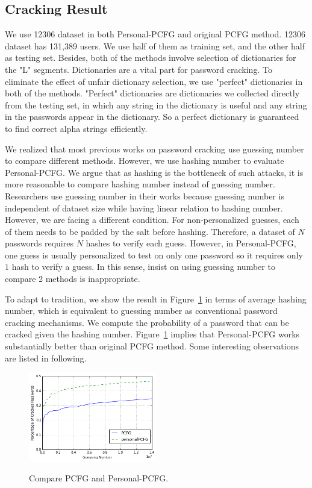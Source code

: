 \subsection{Cracking Result}
We use 12306 dataset in both Personal-PCFG and original PCFG method. 12306 dataset has 131,389 users. We use half of them as training set, and the other half as testing set. Besides, both of the methods involve selection of dictionaries for the "L" segments. Dictionaries are a vital part for password cracking. To eliminate the effect of unfair dictionary selection, we use "perfect" dictionaries in both of the methods. "Perfect" dictionaries are dictionaries we collected directly from the testing set, in which any string in the dictionary is useful and any string in the passwords appear in the dictionary. So a perfect dictionary is guaranteed to find correct alpha strings efficiently.

We realized that most previous works on password cracking use guessing number to compare different methods. However, we use hashing number to evaluate Personal-PCFG. We argue that as hashing is the bottleneck of such attacks, it is more reasonable to compare hashing number instead of guessing number. Researchers use guessing number in their works because guessing number is independent of dataset size while having linear relation to hashing number. However, we are facing a different condition. For non-personalized guesses, each of them needs to be padded by the salt before hashing. Therefore, a dataset of $N$ passwords requires $N$ hashes to verify each guess. However, in Personal-PCFG, one guess is usually personalized to test on only one password so it requires only $1$ hash to verify a guess. In this sense, insist on using guessing number to compare 2 methods is inappropriate.

To adapt to tradition, we show the result in Figure~\ref{f3} in terms of average hashing number, which is equivalent to guessing number as conventional password cracking mechanisms. We compute the probability of a password that can be cracked given the hashing number. Figure~\ref{f3} implies that Personal-PCFG works substantially better than original PCFG method. Some interesting observations are listed in following.

\begin{figure}[h!]
\centering
  \caption{Compare PCFG and Personal-PCFG.}{}
  \label{f3}
  \centering
    \includegraphics[width=0.5\textwidth]{fig/cmp}
\end{figure}

